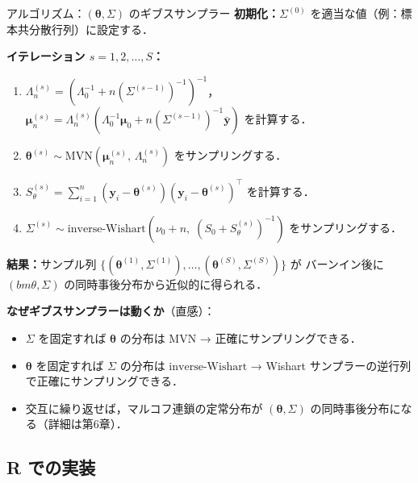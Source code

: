 \documentclass[lualatex,ja=standard,a4paper,12pt]{bxjsarticle}
\newcommand{\mvn}{\mathrm{MVN}}
\newcommand{\IW}{\mathrm{inverse\text{-}Wishart}}
\begin{document}
\begin{algobox}{アルゴリズム：$(\bm{\theta}, \Sigma)$ のギブスサンプラー}
\textbf{初期化：}$\Sigma^{(0)}$ を適当な値（例：標本共分散行列）に設定する．

\medskip
\textbf{イテレーション $s = 1, 2, \ldots, S$：}
\begin{enumerate}
  \item $\Lambda_n^{(s)} = \left(\Lambda_0^{-1} + n\left(\Sigma^{(s-1)}\right)^{-1}\right)^{-1}$，
        $\bm{\mu}_n^{(s)} = \Lambda_n^{(s)}\!\left(\Lambda_0^{-1}\bm{\mu}_0 + n\left(\Sigma^{(s-1)}\right)^{-1}\bar{\bm{y}}\right)$ を計算する．

  \item $\bm{\theta}^{(s)} \sim \mvn\!\left(\bm{\mu}_n^{(s)},\, \Lambda_n^{(s)}\right)$ をサンプリングする．

  \item $S_\theta^{(s)} = \sum_{i=1}^n \left(\bm{y}_i - \bm{\theta}^{(s)}\right)\!\left(\bm{y}_i - \bm{\theta}^{(s)}\right)^\top$ を計算する．

  \item $\Sigma^{(s)} \sim \IW\!\left(\nu_0 + n,\; \left(S_0 + S_\theta^{(s)}\right)^{-1}\right)$ をサンプリングする．
\end{enumerate}

\medskip
\textbf{結果：}サンプル列 $\{(\bm{\theta}^{(1)}, \Sigma^{(1)}), \ldots, (\bm{\theta}^{(S)}, \Sigma^{(S)})\}$ が
バーンイン後に $(bm{\theta}, \Sigma)$ の同時事後分布から近似的に得られる．
\end{algobox}

\begin{pointbox}
\textbf{なぜギブスサンプラーは動くか}（直感）：
\begin{itemize}
  \item $\Sigma$ を固定すれば $\bm{\theta}$ の分布は $\mvn$ → 正確にサンプリングできる．
  \item $\bm{\theta}$ を固定すれば $\Sigma$ の分布は $\IW$ → Wishart サンプラーの逆行列で正確にサンプリングできる．
  \item 交互に繰り返せば，マルコフ連鎖の定常分布が $(\bm{\theta}, \Sigma)$ の同時事後分布になる（詳細は第6章）．
\end{itemize}
\end{pointbox}

\subsection{R での実装}
\end{document}
